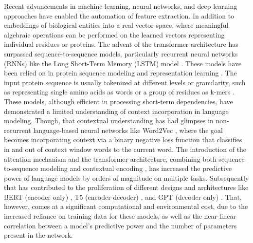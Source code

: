 \documentclass[utf8]{FrontiersinHarvard}
\begin{document}
	Recent advancements in machine learning, neural networks, and deep learning approaches have enabled the automation of feature extraction. In addition to embeddings of biological entities into a real vector space, where meaningful algebraic operations can be performed on the learned vectors representing individual residues or proteins. The advent of the transformer architecture \cite{vaswani_attentionallyou_2017} has surpassed sequence-to-sequence models, particularly recurrent neural networks (RNNs) like the Long Short-Term Memory (LSTM) model \cite{hochreiter_longshorttermmemory_1997}. These models have been relied on in protein sequence modeling and representation learning \cite{cho_learningphraserepresentations_2014}. The input protein sequence is usually tokenized at different levels or granularity, such as representing single amino acids as words or a group of residues as k-mers \cite{guo_usingsupportvector_2008}. These models, although efficient in processing short-term dependencies, have demonstrated a limited understanding of context incorporation in language modeling. Though, that contextual understanding has had glimpses in non-recurrent language-based neural networks like Word2Vec \cite{mikolov_distributedrepresentationswords_2013}, where the goal becomes incorporating context via a binary negative loss function that classifies in and out of context window words to the current word. The introduction of the attention mechanism and the transformer architecture, combining both sequence-to-sequence modeling and contextual encoding \cite{vaswani_attentionallyou_2017}, has increased the predictive power of language models by orders of magnitude on multiple tasks. Subsequently that has contributed to the proliferation of different designs and architectures like BERT (encoder only) \cite{devlin_bertpretrainingdeep_2019}, T5 (encoder-decoder) \cite{raffel_exploringlimitstransfer_2023}, and GPT (decoder only) \cite{brown_languagemodelsare_2020}. That, however, comes at a significant computational and environmental cost, due to the increased reliance on training data for these models, as well as the near-linear correlation between a model's predictive power and the number of parameters present in the network. 
	
\end{document}
